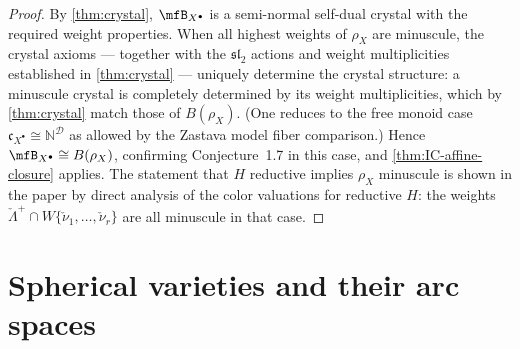\begin{proof}
  By \cref{thm:crystal}, \( \mfB_{X^\bullet} \) is a semi-normal self-dual crystal with the
  required weight properties. When all highest weights of \( \rho_X \) are minuscule,
  the crystal axioms — together with the \( \mathfrak{sl}_2 \) actions and weight multiplicities
  established in \cref{thm:crystal} — uniquely determine the crystal structure: a minuscule
  crystal is completely determined by its weight multiplicities, which by \cref{thm:crystal}
  match those of \( B(\rho_X) \). (One reduces to the free monoid case
  \( \mathfrak{c}_{X^\bullet} \cong \mathbb{N}^{\mathcal{D}} \) as allowed by the Zastava
  model fiber comparison.) Hence \( \mfB_{X^\bullet} \cong B(\rho_X) \), confirming
  Conjecture~1.7 in this case, and \cref{thm:IC-affine-closure} applies.
  The statement that \( H \) reductive implies \( \rho_X \) minuscule is shown in the paper by
  direct analysis of the color valuations for reductive \( H \): the weights
  \( \check\Lambda^+ \cap W\{\check\nu_1,\ldots,\check\nu_r\} \) are all minuscule in
  that case.
\end{proof}


\section{Spherical varieties and their arc spaces}

